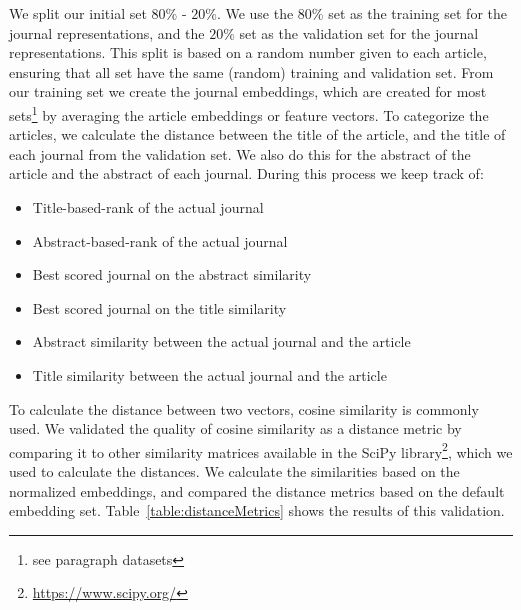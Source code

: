 \documentclass[../../Thesis.tex]{subfiles}
\begin{document}
We split our initial set  $80\%$ - $20\%$. We use the $80\%$ set as the training set for the journal representations, and the $20\%$ set as the validation set for the journal representations. This split is based on a random number given to each article, ensuring that all set have the same (random) training and validation set.
From our training set we create the journal embeddings, which are created for most sets\footnote{see paragraph datasets} by averaging the article embeddings or feature vectors.
\clearpage
{}
To categorize the articles, we calculate the distance between the title of the article, and the title of each journal from the validation set. We also do this for the abstract of the article and the abstract of each journal. During this process we keep track of:
\begin{itemize}
\item{Title-based-rank of the actual journal}
\item{Abstract-based-rank of the actual journal}
\item{Best scored journal on the abstract similarity}
\item{Best scored journal on the title similarity}
\item{Abstract similarity between the actual journal and the article}
\item{Title similarity between the actual journal and the article}
\end{itemize}
To calculate the distance between two vectors, cosine similarity is commonly used. We validated the quality of cosine similarity as a distance metric by comparing it to other similarity matrices available in the SciPy library\footnote{\url{https://www.scipy.org/}}, which we used to calculate the distances. We calculate the similarities based on the normalized embeddings, and compared the distance metrics based on the default embedding set. Table~\ref{table:distanceMetrics} shows the results of this validation.\\
\end{document}
